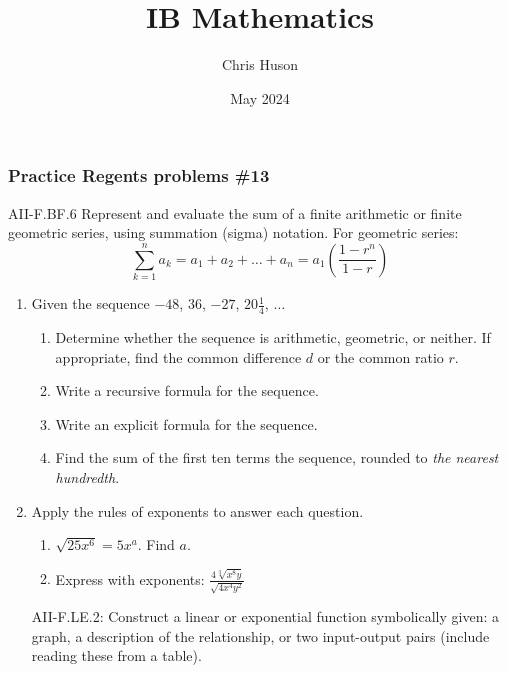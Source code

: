 \documentclass[12pt, twoside]{article}
\title{IB Mathematics}
\author{Chris Huson}
\date{May 2024}
\begin{document}
\subsubsection*{Practice Regents problems \#13}
AII-F.BF.6 Represent and evaluate the sum of a finite arithmetic
or finite geometric series, using summation (sigma) notation. For geometric series:
$$\sum_{k=1}^{n} a_k = a_1 + a_2 + \ldots + a_n = a_1 \left( \frac{1-r^n}{1-r} \right)$$

\begin{enumerate}
\item Given the sequence $-48$, $36$, $-27$, $20 \frac{1}{4}$, $\ldots$
\begin{enumerate}[itemsep=2cm]
    \item Determine whether the sequence is arithmetic, geometric, or neither. If appropriate, find the common difference $d$ or the common ratio $r$.
    \item Write a recursive formula for the sequence.
    \item Write an explicit formula for the sequence.
    \item Find the sum of the first ten terms the sequence, rounded to \emph{the nearest hundredth}.
\end{enumerate} \vspace{3cm}

\item Apply the rules of exponents to answer each question. 
\begin{multicols}{2}
    \begin{enumerate}
        \item $\sqrt{25x^6} = 5x^a$. Find $a$.
        \item Express with exponents: $\displaystyle \frac{4\sqrt[3]{x^{8}y}}{\sqrt{4x^{4}y^2}}$
    \end{enumerate}
\end{multicols}
\vspace{3cm}

\newpage
AII-F.LE.2: Construct a linear or exponential function symbolically given: a graph, a description of the relationship, or two input-output pairs (include reading these from a table).


\end{enumerate}
\end{document}
